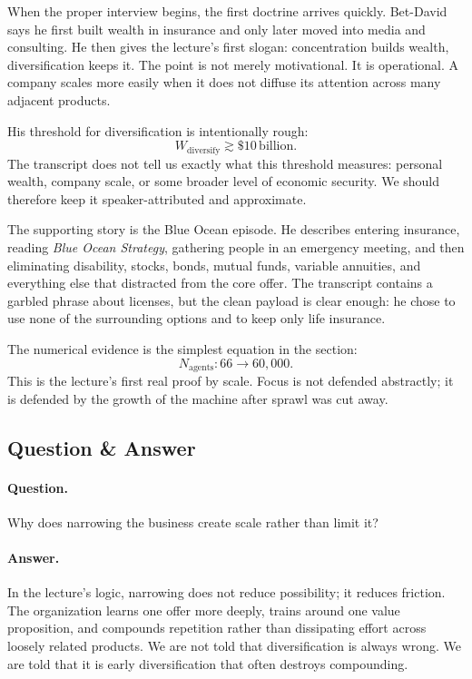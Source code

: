 When the proper interview begins, the first doctrine arrives quickly. Bet-David says he first built wealth in insurance and only later moved into media and consulting. He then gives the lecture's first slogan: concentration builds wealth, diversification keeps it. The point is not merely motivational. It is operational. A company scales more easily when it does not diffuse its attention across many adjacent products.

His threshold for diversification is intentionally rough:
\begin{equation}
W_{\text{diversify}} \gtrsim \$10\,\text{billion}.
\end{equation}
The transcript does not tell us exactly what this threshold measures: personal wealth, company scale, or some broader level of economic security. We should therefore keep it speaker-attributed and approximate.

The supporting story is the Blue Ocean episode. He describes entering insurance, reading \emph{Blue Ocean Strategy}, gathering people in an emergency meeting, and then eliminating disability, stocks, bonds, mutual funds, variable annuities, and everything else that distracted from the core offer. The transcript contains a garbled phrase about licenses, but the clean payload is clear enough: he chose to use none of the surrounding options and to keep only life insurance.

The numerical evidence is the simplest equation in the section:
\begin{equation}
N_{\text{agents}} : 66 \longrightarrow 60{,}000.
\end{equation}
This is the lecture's first real proof by scale. Focus is not defended abstractly; it is defended by the growth of the machine after sprawl was cut away.

\subsection{Question \& Answer}

\paragraph{Question.} Why does narrowing the business create scale rather than limit it?

\paragraph{Answer.} In the lecture's logic, narrowing does not reduce possibility; it reduces friction. The organization learns one offer more deeply, trains around one value proposition, and compounds repetition rather than dissipating effort across loosely related products. We are not told that diversification is always wrong. We are told that it is early diversification that often destroys compounding.

